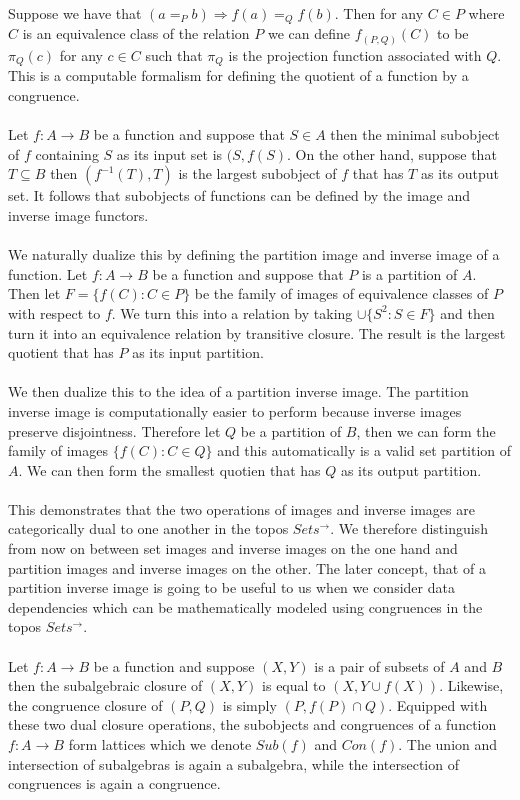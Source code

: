 \documentclass[a4paper,11pt]{report}
\begin{document}
Suppose we have that $(a =_P b) \Rightarrow f(a) =_Q f(b)$. Then for any $C \in P$ where $C$ is an equivalence class of the relation $P$ we can define $f_{(P,Q)}(C)$ to be $\pi_Q(c)$ for any $c \in C$ such that $\pi_Q$ is the projection function associated with $Q$. This is a computable formalism for defining the quotient of a function by a congruence. \\
\\ 
Let $f: A \to B$ be a function and suppose that $S \in A$ then the minimal subobject of $f$ containing $S$ as its input set is $(S,f(S)$. On the other hand, suppose that $T \subseteq B$ then $(f^{-1}(T),T)$ is the largest subobject of $f$ that has $T$ as its output set. It follows that subobjects of functions can be defined by the image and inverse image functors.
\\ \\
We naturally dualize this by defining the partition image and inverse image of a function. Let $f : A \to B$ be a function and suppose that $P$ is a partition of $A$. Then let $F = \{f(C) : C \in P\}$ be the family of images of equivalence classes of $P$ with respect to $f$. We turn this into a relation by taking $\cup \{ S^2 : S \in F \}$ and then turn it into an equivalence relation by transitive closure. The result is the largest quotient that has $P$ as its input partition.
\\ \\
We then dualize this to the idea of a partition inverse image. The partition inverse image is computationally easier to perform because inverse images preserve disjointness. Therefore let $Q$ be a partition of $B$, then we can form the family of images $\{f(C) : C \in Q \}$ and this automatically is a valid set partition of $A$. We can then form the smallest quotien that has $Q$ as its output partition.
\\ \\ 
This demonstrates that the two operations of images and inverse images are categorically dual to one another in the topos $Sets^{\to}$. We therefore distinguish from now on between set images and inverse images on the one hand and partition images and inverse images on the other. The later concept, that of a partition inverse image is going to be useful to us when we consider data dependencies which can be mathematically modeled using congruences in the topos $Sets^{\to}$.
\\ \\
Let $f: A \to B$ be a function and suppose $(X,Y)$ is a pair of subsets of $A$ and $B$ then the subalgebraic closure of $(X,Y)$ is equal to $(X, Y \cup f(X))$. Likewise, the congruence closure of $(P,Q)$ is simply $(P, f(P) \cap Q)$. Equipped with these two dual closure operations, the subobjects and congruences of a function $f: A \to B$ form lattices which we denote $Sub(f)$ and $Con(f)$. The union and intersection of subalgebras is again a subalgebra, while the intersection of congruences is again a congruence.
\end{document}
